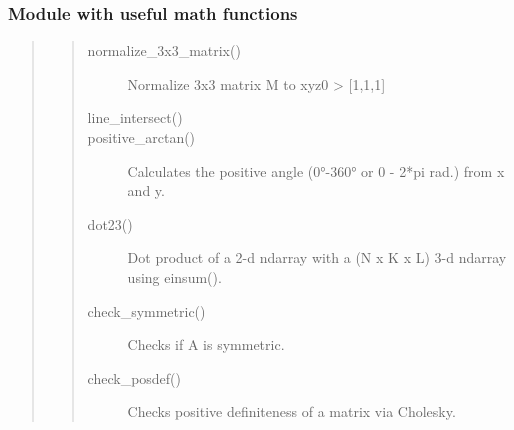 \documentclass[letterpaper,10pt,english]{sphinxmanual}
\begin{document}
\subsubsection{Module with useful math functions}
\label{\detokenize{utils:module-with-useful-math-functions}}\begin{quote}
\begin{quote}\begin{description}
\item[{normalize\_3x3\_matrix()}] \leavevmode
Normalize 3x3 matrix M to xyz0 \textendash{} \textgreater{} {[}1,1,1{]}

\item[{line\_intersect()}] \leavevmode
{}

\item[{positive\_arctan()}] \leavevmode
Calculates the positive angle (0°-360° or 0 - 2*pi rad.) 
from x and y.

\item[{dot23()}] \leavevmode
Dot product of a 2-d ndarray 
with a (N x K x L) 3-d ndarray using einsum().

\item[{check\_symmetric()}] \leavevmode
Checks if A is symmetric.

\item[{check\_posdef()}] \leavevmode
Checks positive definiteness of a matrix via Cholesky.


\end{description}
\end{quote}
\end{quote}
\end{document}
